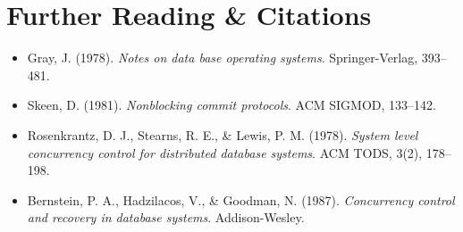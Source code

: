 \section{Further Reading \protect\& Citations}
\begin{itemize}[leftmargin=18pt]
  \item Gray, J. (1978). \emph{Notes on data base operating systems}. Springer-Verlag, 393--481.
  \item Skeen, D. (1981). \emph{Nonblocking commit protocols}. ACM SIGMOD, 133--142.
  \item Rosenkrantz, D. J., Stearns, R. E., \& Lewis, P. M. (1978). \emph{System level concurrency control for distributed database systems}. ACM TODS, 3(2), 178--198.
  \item Bernstein, P. A., Hadzilacos, V., \& Goodman, N. (1987). \emph{Concurrency control and recovery in database systems}. Addison-Wesley.
\end{itemize}
